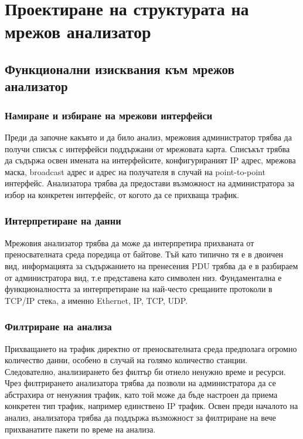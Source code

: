 \documentclass[12pt,a4paper,oneside]{book}
\begin{document}
\chapter{Проектиране на структурата на мрежов анализатор}

\section{Функционални изисквания към мрежов анализатор}

\subsection{Намиране и избиране на мрежови интерфейси}

Преди да започне какъвто и да било анализ, мрежовия администратор трябва да
получи списък с интерфейси поддържани от мрежовата карта. Списъкът трябва да
съдържа освен имената на интерфейсите, конфигурираният IP адрес,
мрежова маска, broadcast адрес и адрес на получателя в случай на point-to-point
интерфейс. Анализатора трябва да предостави възможност на администратора за
избор на конкретен интерфейс, от когото да се прихваща трафик.

\subsection{Интерпретиране на данни}

Мрежовия анализатор трябва да може да интерпретира прихваната от преносвателната
среда поредица от байтове. Тъй като типично тя е в двоичен вид, информацията за
съдържанието на пренесения PDU трябва да е в разбираем от администратора вид,
т.е представена като символен низ. Фундаментална е функционалността за
интерпретиране на най-често срещаните протоколи в TCP/IP стекa, а именно
Ethernet, IP, TCP, UDP.

\subsection{Филтриране на анализа}

Прихващането на трафик директно от преносвателната среда предполага огромно
количество данни, особено в случай на голямо количество станции. Следователно,
анализирането без филтър би отнело ненужно време и ресурси. Чрез филтрирането
анализатора трябва да позволи на администратора да се абстрахира от ненужния
трафик, като той може да бъде настроен да приема конкретен тип трафик, например
единствено IP трафик. Освен преди началото на анализ, анализатора трябва да
поддържа възможност за филтриране на вече прихванатите пакети по време на анализа.
\end{document}
